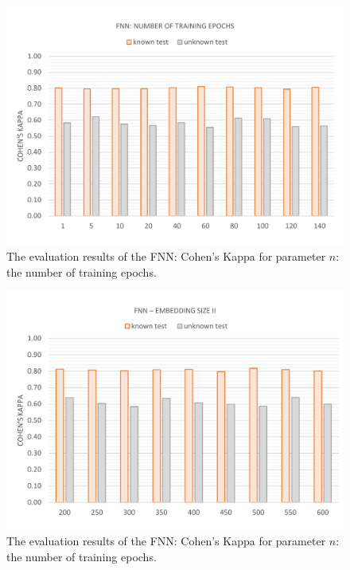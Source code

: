 \vspace{-11mm}
\begin{figure}[H]
	\centering\includegraphics[width=\textwidth]{images/evaluation_fnn_n_k}
	\caption[FNN Evaluation: Number of Training Epochs]{The evaluation results of the FNN: Cohen's Kappa for parameter $n$: the number of training epochs.}
	\label{f.evaluation.fnn.n.k}
\end{figure}

\vspace{-11mm}
\begin{figure}[H]
	\centering\includegraphics[width=\textwidth]{images/evaluation_fnn_e2_k}
	\caption[FNN Evaluation: Number of Training Epochs]{The evaluation results of the FNN: Cohen's Kappa for parameter $n$: the number of training epochs.}
	\label{f.evaluation.fnn.e2.k}
\end{figure}

